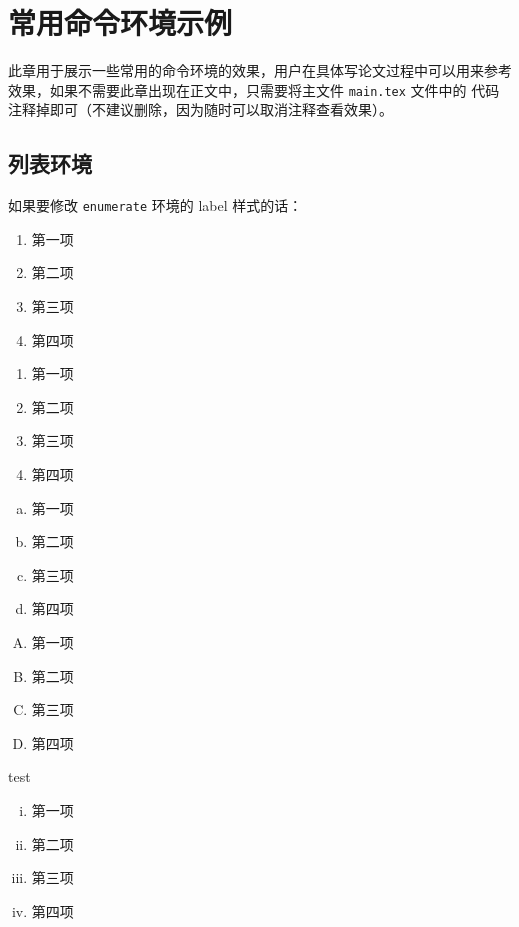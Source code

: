 
\chapter{常用命令环境示例}

此章用于展示一些常用的命令环境的效果，用户在具体写论文过程中可以用来参考效果，如果不需要此章出现在正文中，只需要将主文件 \verb|main.tex| 文件中的 \verb|| 代码注释掉即可（不建议删除，因为随时可以取消注释查看效果）。


\section{列表环境}


如果要修改 \verb|enumerate| 环境的 label 样式的话：

\begin{enumerate}
  \item 第一项
  \item 第二项
  \item 第三项
  \item 第四项
\end{enumerate}

\begin{enumerate}[1)]
  \item 第一项
  \item 第二项
  \item 第三项
  \item 第四项
\end{enumerate}

\begin{enumerate}[a.]
  \item 第一项
  \item 第二项
  \item 第三项
  \item 第四项
\end{enumerate}

\begin{enumerate}[(A)]
  \item 第一项
  \item 第二项
  \item 第三项
  \item 第四项
\end{enumerate}

test
\begin{enumerate}[(i)]
  \item 第一项
  \item 第二项
  \item 第三项
  \item 第四项
\end{enumerate}


